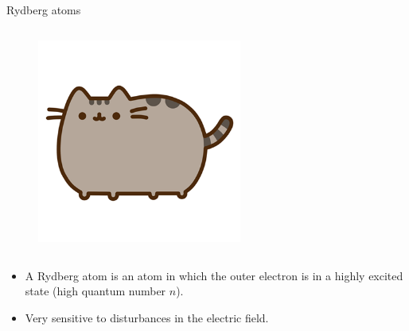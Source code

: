 \begin{columnframe}{Rydberg atoms}
    \begin{column}{0.5\textwidth}
        \begin{figure}
            \centering
            \includegraphics[width=0.6\textwidth]{images/pusheen.png}

        \end{figure}
    \end{column}
    \begin{column}{0.5\textwidth}
        \begin{itemize}
            \item A Rydberg atom is an atom in which the outer electron is in a highly excited state (high quantum number $n$).
            \item Very sensitive to disturbances in the electric field.
        \end{itemize}
    \end{column}
\end{columnframe}

